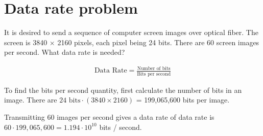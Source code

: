 
\section{Data rate problem}
It is desired to send a sequence of computer screen images over optical fiber. The screen is 3840 $\times$ 2160 pixels, each pixel being 24 bits. There are 60 screen images per second. What data rate is needed?

\begin{align*}
	\text{Data Rate} = \frac{\text{Number of bits}}{\text{Bits per second}}
\end{align*}

To find the bits per second quantity, first calculate the number of bits in an image. There are $24 \text{ bits} \cdot (3840 \times 2160)$ = 199,065,600 bits per image. 

Transmitting 60 images per second gives a data rate of data rate is $60 \cdot 199,065,600 = 1.194 \cdot 10^{10}$ bits / second.

\section{}
\section{}
\section{}
\section{}
\section{}
\section{}
